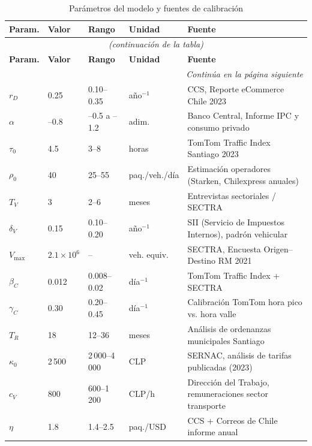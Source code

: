 \documentclass[12pt,a4paper]{article}
\begin{document}
\begin{longtable}{@{}p{2cm}p{2.5cm}p{2.5cm}p{1.5cm}p{4cm}@{}}
\caption{Parámetros del modelo y fuentes de calibración}
\label{tab:parametros}\\
\toprule
\rowcolor{azulUCH!15}
\textbf{Param.} & \textbf{Valor} & \textbf{Rango} & \textbf{Unidad}
  & \textbf{Fuente} \\
\midrule
\endfirsthead
\multicolumn{5}{c}{\small\textit{(continuación de la tabla)}}\\
\toprule
\rowcolor{azulUCH!15}
\textbf{Param.} & \textbf{Valor} & \textbf{Rango} & \textbf{Unidad}
  & \textbf{Fuente} \\
\midrule
\endhead
\midrule
\multicolumn{5}{r}{\small\textit{Continúa en la página siguiente}}\\
\endfoot
\bottomrule
\endlastfoot

$r_D$       & 0.25   & 0.10--0.35  & año$^{-1}$
  & CCS, Reporte eCommerce Chile 2023 \\

$\alpha$    & --0.8  & --0.5 a --1.2 & adim.
  & Banco Central, Informe IPC y consumo privado \\

$\tau_0$    & 4.5    & 3--8        & horas
  & TomTom Traffic Index Santiago 2023 \\

$\rho_0$    & 40     & 25--55      & paq./veh./día
  & Estimación operadores (Starken, Chilexpress anuales) \\

$T_V$       & 3      & 2--6        & meses
  & Entrevistas sectoriales / SECTRA \\

$\delta_V$  & 0.15   & 0.10--0.20  & año$^{-1}$
  & SII (Servicio de Impuestos Internos), padrón vehicular \\

$V_{\max}$  & $2.1\times10^6$ & -- & veh. equiv.
  & SECTRA, Encuesta Origen--Destino RM 2021 \\

$\beta_C$   & 0.012  & 0.008--0.02 & día$^{-1}$
  & TomTom Traffic Index + SECTRA \\

$\gamma_C$  & 0.30   & 0.20--0.45  & día$^{-1}$
  & Calibración TomTom hora pico vs. hora valle \\

$T_R$       & 18     & 12--36      & meses
  & Análisis de ordenanzas municipales Santiago \\

$\kappa_0$  & 2\,500 & 2\,000--4\,000 & CLP
  & SERNAC, análisis de tarifas publicadas (2023) \\

$c_V$       & 800    & 600--1\,200 & CLP/h
  & Dirección del Trabajo, remuneraciones sector transporte \\

$\eta$      & 1.8    & 1.4--2.5    & paq./USD
  & CCS + Correos de Chile informe anual \\

\end{longtable}
\end{document}

